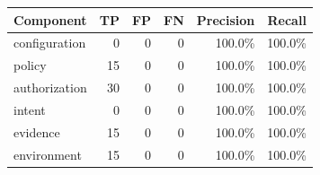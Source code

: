 \begin{tabular}{@{}lrrrrr@{}}
\toprule
Component & TP & FP & FN & Precision & Recall \\
\midrule
configuration & 0 & 0 & 0 & 100.0\% & 100.0\% \\
policy & 15 & 0 & 0 & 100.0\% & 100.0\% \\
authorization & 30 & 0 & 0 & 100.0\% & 100.0\% \\
intent & 0 & 0 & 0 & 100.0\% & 100.0\% \\
evidence & 15 & 0 & 0 & 100.0\% & 100.0\% \\
environment & 15 & 0 & 0 & 100.0\% & 100.0\% \\
\bottomrule
\end{tabular}
